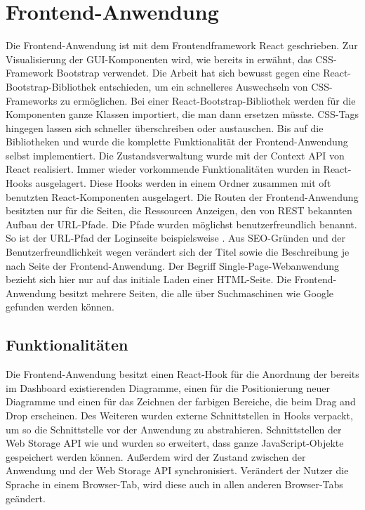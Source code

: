 \section{Frontend-Anwendung}
\label{sec:frontendanwendung}
Die Frontend-Anwendung ist mit dem Frontendframework React geschrieben.
Zur Visualisierung der GUI-Komponenten wird, wie bereits in 
erwähnt, das CSS-Framework Bootstrap verwendet. Die Arbeit hat sich bewusst gegen
eine React-Bootstrap-Bibliothek entschieden, um ein schnelleres Auswechseln von CSS-Frameworks
zu ermöglichen. Bei einer React-Bootstrap-Bibliothek werden für die Komponenten ganze Klassen importiert,
die man dann ersetzen müsste. CSS-Tags hingegen lassen sich schneller überschreiben oder austauschen.
Bis auf die Bibliotheken  und  wurde die komplette Funktionalität der Frontend-Anwendung
selbst implementiert. Die Zustandsverwaltung wurde mit der Context API von React realisiert.
Immer wieder vorkommende Funktionalitäten wurden in React-Hooks ausgelagert. Diese Hooks werden in einem
 Ordner zusammen mit oft benutzten React-Komponenten ausgelagert. Die Routen der Frontend-Anwendung
besitzten nur für die Seiten, die Ressourcen Anzeigen, den von REST bekannten Aufbau der URL-Pfade. Die Pfade
wurden möglichst benutzerfreundlich benannt. So ist der URL-Pfad der Loginseite beispielsweise .
Aus SEO-Gründen und der Benutzerfreundlichkeit wegen verändert sich der Titel sowie die Beschreibung je nach
Seite der Frontend-Anwendung. Der Begriff Single-Page-Webanwendung bezieht sich hier nur auf das initiale Laden
einer HTML-Seite. Die Frontend-Anwendung besitzt mehrere Seiten, die alle über Suchmaschinen wie Google
gefunden werden können.

\subsection{Funktionalitäten}
\label{subsec:funktionalitaeten}
Die Frontend-Anwendung besitzt einen React-Hook für die Anordnung der bereits im Dashboard existierenden Diagramme, einen für
die Positionierung neuer Diagramme und einen für das Zeichnen der farbigen Bereiche, die beim Drag and Drop erscheinen.
Des Weiteren wurden externe Schnittstellen in Hooks verpackt, um so die Schnittstelle vor der Anwendung
zu abstrahieren. Schnittstellen der Web Storage API wie  und 
wurden so erweitert, dass ganze JavaScript-Objekte gespeichert werden können. Außerdem wird der Zustand zwischen
der Anwendung und der Web Storage API synchronisiert. Verändert der Nutzer die Sprache in einem
Browser-Tab, wird diese auch in allen anderen Browser-Tabs geändert.

